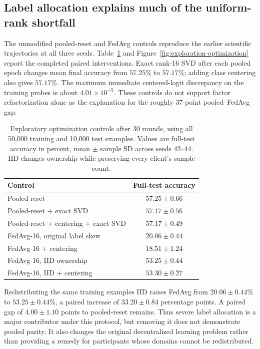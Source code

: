 \documentclass[11pt]{article}
\begin{document}
\subsection{Label allocation explains much of the uniform-rank shortfall}
The unmodified pooled-reset and FedAvg controls reproduce the earlier scientific trajectories at all three seeds. Table~\ref{tab:optimization-controls} and Figure~\ref{fig:exploration-optimization} report the completed paired interventions. Exact rank-16 SVD after each pooled epoch changes mean final accuracy from $57.25\%$ to $57.17\%$; adding class centering also gives $57.17\%$. The maximum immediate centered-logit discrepancy on the training probes is about $4.01\times10^{-5}$. These controls do not support factor refactorization alone as the explanation for the roughly 37-point pooled--FedAvg gap.

\begin{table}[t]
\centering
\caption{Exploratory optimization controls after 30 rounds, using all 50,000 training and 10,000 test examples. Values are full-test accuracy in percent, mean $\pm$ sample SD across seeds 42--44. IID changes ownership while preserving every client's sample count.}
\label{tab:optimization-controls}
\small
\begin{tabular}{lc}
\toprule
Control & Full-test accuracy\\
\midrule
Pooled-reset & $57.25\pm0.66$\\
Pooled-reset + exact SVD & $57.17\pm0.56$\\
Pooled-reset + centering + exact SVD & $57.17\pm0.49$\\
FedAvg-16, original label skew & $20.06\pm0.44$\\
FedAvg-16 + centering & $18.51\pm1.24$\\
FedAvg-16, IID ownership & $53.25\pm0.44$\\
FedAvg-16, IID + centering & $53.30\pm0.27$\\
\bottomrule
\end{tabular}
\end{table}

Redistributing the same training examples IID raises FedAvg from $20.06\pm0.44\%$ to $53.25\pm0.44\%$, a paired increase of $33.20\pm0.84$ percentage points. A paired gap of $4.00\pm1.10$ points to pooled-reset remains. Thus severe label allocation is a major contributor under this protocol, but removing it does not demonstrate pooled parity. It also changes the original decentralized learning problem rather than providing a remedy for participants whose domains cannot be redistributed.
\end{document}
